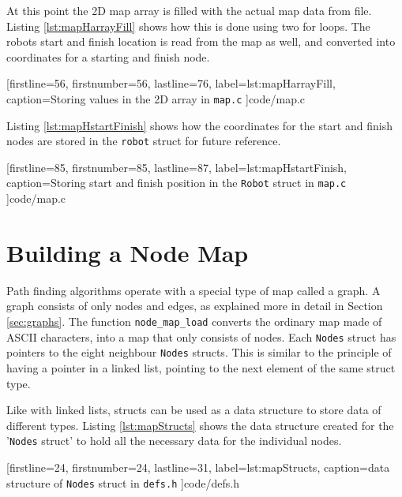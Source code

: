 \newpage
At this point the 2D map array is filled with the actual map data from file.
Listing \ref{lst:mapHarrayFill} shows how this is done using two for loops.
The robots start and finish location is read from the map as well,
and converted into coordinates for a starting and finish node.


[firstline=56,			%
firstnumber=56,		%
lastline=76,			%
label=lst:mapHarrayFill,	%
caption={Storing values in the 2D array in {\tt map.c}}
]{code/map.c}

Listing \ref{lst:mapHstartFinish} shows how the coordinates for the start and finish nodes are stored in the {\tt robot} struct for future reference. 


[firstline=85,			%
firstnumber=85,		%
lastline=87,			%
label=lst:mapHstartFinish,	%
caption={Storing start and finish position in the {\tt Robot} struct in {\tt map.c}}
]{code/map.c}

\newpage

\section{Building a Node Map}
\label{sec:map_node} %
Path finding algorithms operate with a special type of map called a graph.
A graph consists of only nodes and edges, as explained more in detail in Section \ref{sec:graphs}.
The function {\tt node\_map\_load} converts the ordinary map made of ASCII characters, into a map that only consists of nodes.
Each {\tt Nodes} struct has pointers to the eight neighbour {\tt Nodes} structs.
This is similar to the principle of having a pointer in a linked list, pointing to the next element of the same struct type.

Like with linked lists, structs can be used as a data structure to store data of different types. 
Listing \ref{lst:mapStructs} shows the data structure created for the '{\tt Nodes} struct' to hold all the necessary data for the individual nodes.


[firstline=24,			%
firstnumber=24,		%
lastline=31,			%
label=lst:mapStructs,	%
caption={data structure of {\tt Nodes} struct in {\tt defs.h}}
]{code/defs.h}

